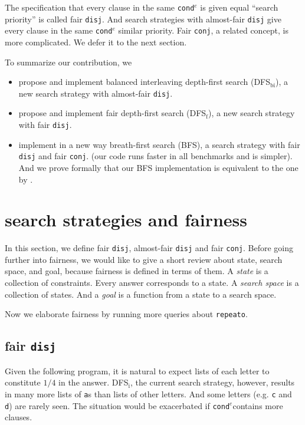 \documentclass[format=acmlarge, review=true, authordraft=true]{acmart}
\newcommand{\conde}{\texttt{cond$^e$}}
\newcommand{\conj}{\texttt{conj}}
\newcommand{\disj}{\texttt{disj}}
\newcommand{\DFSi }[0]{DFS$_\textrm{i}$}
\newcommand{\DFSf }[0]{DFS$_\textrm{f}$}
\newcommand{\DFSbi}[0]{DFS$_\textrm{bi}$}
\begin{document}
The specification that every clause in the same \conde{} is given equal 
``search priority'' is called fair \disj{}. And search strategies with 
almost-fair \disj{} give every clause in the same \conde{} similar priority. 
Fair \conj{}, a related concept, is more complicated. We defer it to the next 
section.

To summarize our contribution, we
\begin{itemize}
	\item propose and implement balanced interleaving depth-first search 
	(\DFSbi{}), a new search strategy with almost-fair \disj{}.
	\item propose and implement fair depth-first search (\DFSf{}), a 
	new search strategy with fair \disj{}.
	\item implement in a new way breath-first search (BFS), a search strategy 
	with fair \disj{} and fair \conj{}. (our code runs faster in all 
benchmarks and is simpler). And we prove formally that our BFS implementation 
is equivalent to the one by \citet{seres1999algebra}.
\end{itemize}

\section{search strategies and fairness}

In this section, we define fair \disj{}, almost-fair \disj{} and fair \conj{}. 
Before going further into fairness, we would like to give a short review about 
state, search space, and goal, because fairness is defined in terms of them. 
A \emph{state} is a collection of constraints. Every answer corresponds to a 
state. A \emph{search space} is a collection of states. And a \emph{goal} is a 
function from a state to a search space. 


Now we elaborate fairness by running more queries about \texttt{repeato}.

\subsection{fair \texttt{disj}}

Given the following program, it is natural to expect lists of each letter to
constitute $1/4$ in the answer. \DFSi, the current search
strategy, however, results in many more lists of \texttt{a}s than lists
of other letters. And some letters  (e.g. \texttt{c} and \texttt{d}) are
rarely seen. The situation would be exacerbated if \conde contains more clauses.
\end{document}

